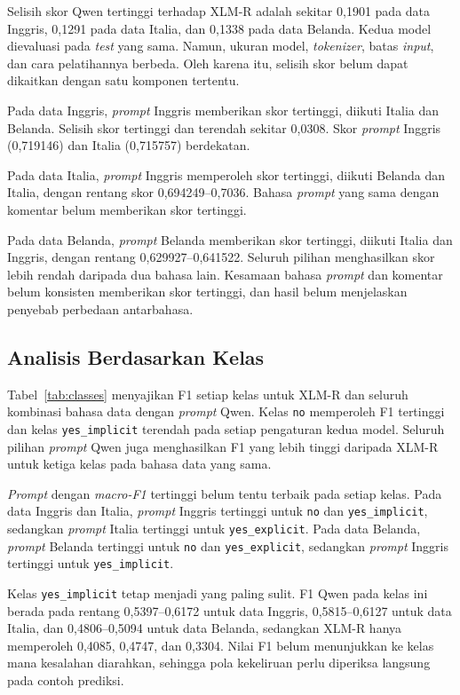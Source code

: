 \documentclass[11pt]{article}
\begin{document}
Selisih skor Qwen tertinggi terhadap XLM-R adalah sekitar 0,1901 pada data Inggris, 0,1291 pada data Italia, dan 0,1338 pada data Belanda. Kedua model dievaluasi pada \textit{test} yang sama. Namun, ukuran model, \textit{tokenizer}, batas \textit{input}, dan cara pelatihannya berbeda. Oleh karena itu, selisih skor belum dapat dikaitkan dengan satu komponen tertentu.

Pada data Inggris, \textit{prompt} Inggris memberikan skor tertinggi, diikuti Italia dan Belanda. Selisih skor tertinggi dan terendah sekitar 0,0308. Skor \textit{prompt} Inggris (0,719146) dan Italia (0,715757) berdekatan.

Pada data Italia, \textit{prompt} Inggris memperoleh skor tertinggi, diikuti Belanda dan Italia, dengan rentang skor 0,694249--0,7036. Bahasa \textit{prompt} yang sama dengan komentar belum memberikan skor tertinggi.

Pada data Belanda, \textit{prompt} Belanda memberikan skor tertinggi, diikuti Italia dan Inggris, dengan rentang 0,629927--0,641522. Seluruh pilihan menghasilkan skor lebih rendah daripada dua bahasa lain. Kesamaan bahasa \textit{prompt} dan komentar belum konsisten memberikan skor tertinggi, dan hasil belum menjelaskan penyebab perbedaan antarbahasa.

\subsection{Analisis Berdasarkan Kelas}

Tabel~\ref{tab:classes} menyajikan F1 setiap kelas untuk XLM-R dan seluruh kombinasi bahasa data dengan \textit{prompt} Qwen. Kelas \texttt{no} memperoleh F1 tertinggi dan kelas \texttt{yes\_implicit} terendah pada setiap pengaturan kedua model. Seluruh pilihan \textit{prompt} Qwen juga menghasilkan F1 yang lebih tinggi daripada XLM-R untuk ketiga kelas pada bahasa data yang sama.



\textit{Prompt} dengan \textit{macro-F1} tertinggi belum tentu terbaik pada setiap kelas. Pada data Inggris dan Italia, \textit{prompt} Inggris tertinggi untuk \texttt{no} dan \texttt{yes\_implicit}, sedangkan \textit{prompt} Italia tertinggi untuk \texttt{yes\_explicit}. Pada data Belanda, \textit{prompt} Belanda tertinggi untuk \texttt{no} dan \texttt{yes\_explicit}, sedangkan \textit{prompt} Inggris tertinggi untuk \texttt{yes\_implicit}.

Kelas \texttt{yes\_implicit} tetap menjadi yang paling sulit. F1 Qwen pada kelas ini berada pada rentang 0,5397--0,6172 untuk data Inggris, 0,5815--0,6127 untuk data Italia, dan 0,4806--0,5094 untuk data Belanda, sedangkan XLM-R hanya memperoleh 0,4085, 0,4747, dan 0,3304. Nilai F1 belum menunjukkan ke kelas mana kesalahan diarahkan, sehingga pola kekeliruan perlu diperiksa langsung pada contoh prediksi.
\end{document}
